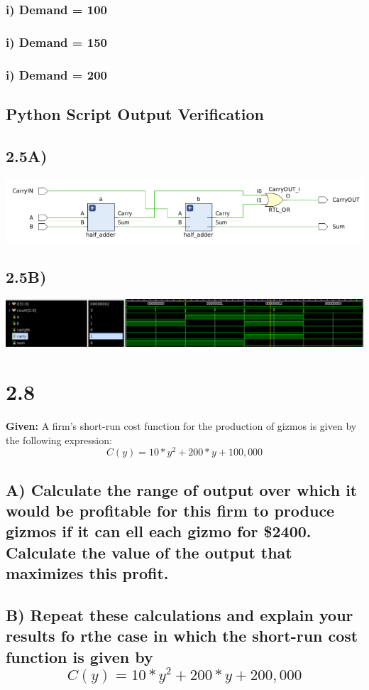 \documentclass{article}
\begin{document}
\subsubsection{i) Demand = 100}

\subsubsection{i) Demand = 150}

\subsubsection{i) Demand = 200}

\subsection{Python Script Output Verification}
\subsection{2.5A)}
\includegraphics[width=\textwidth]{apple.png}
\subsection{2.5B)}
\includegraphics[width=\textwidth]{beta.png}

\pagebreak
\section{2.8}
\textbf{Given:} A firm's short-run cost function for the production of gizmos is given by the following expression: $$ C(y) = 10*y^2 + 200*y + 100,000 $$

\subsection{A) Calculate the range of output over which it would be profitable for this firm to produce gizmos if it can ell each gizmo for \$2400. Calculate the value of the output that maximizes this profit.}


\subsection{B) Repeat these calculations and explain your results fo rthe case in which the short-run cost function is given by $$ C(y) = 10*y^2 + 200*y + 200,000 $$}
\end{document}
